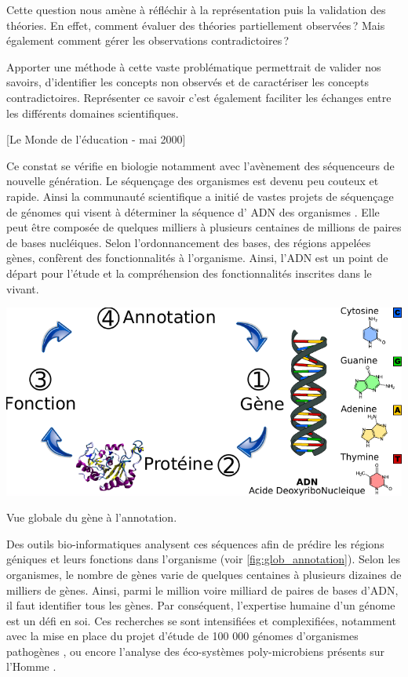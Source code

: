 \begin{refsegment}
Cette question nous amène à réfléchir à la représentation puis la validation des théories. En effet, comment évaluer des théories partiellement observées ? Mais également comment gérer les observations contradictoires ?

Apporter une méthode à cette vaste problématique permettrait de valider nos savoirs, d'identifier les concepts non observés et de caractériser les concepts contradictoires. Représenter ce savoir c'est également faciliter les échanges entre les différents domaines scientifiques.

[Le Monde de l'éducation - mai 2000]

Ce constat se vérifie en biologie notamment avec l'avènement des séquenceurs de nouvelle génération. Le séquençage des organismes est devenu peu couteux et rapide. Ainsi la communauté scientifique a initié de vastes projets de séquençage de génomes qui visent à déterminer la séquence d' \gls{ADN} des organismes . Elle peut être composée de quelques milliers à plusieurs centaines de millions de paires de bases nucléiques. Selon l'ordonnancement des bases, des régions appelées gènes, confèrent des fonctionnalités à l'organisme. Ainsi, l'\gls{ADN} est un point de départ pour l'étude et la compréhension des fonctionnalités inscrites dans le vivant.


\begin{shadedfigure}
    \centering
    \includegraphics{img/simple_annotation_process.pdf}
    \caption{Vue globale du gène à l'annotation.}
    \label{fig:glob_annotation}
\end{shadedfigure}

Des outils bio-informatiques analysent ces séquences afin de prédire les régions géniques et leurs fonctions dans l'organisme (voir \cref{fig:glob_annotation}). Selon les organismes, le nombre de gènes varie de quelques centaines à plusieurs dizaines de milliers de gènes. Ainsi, parmi le million voire milliard de paires de bases d'\gls{ADN}, il faut identifier tous les gènes. Par conséquent, l'expertise humaine d'un génome est un défi en soi. Ces recherches se sont intensifiées et complexifiées, notamment avec la mise en place du projet d'étude de 100 000 génomes d'organismes pathogènes \cite{100kfoodborne}, ou encore l'analyse des éco-systèmes poly-microbiens présents sur l'Homme \cite{hmp}.


\end{refsegment}
